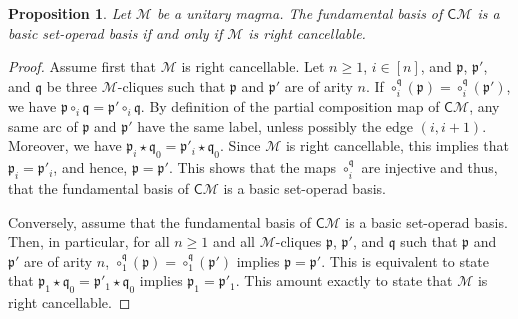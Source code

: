 \documentclass[10pt,reqno]{amsart}
\numberwithin{equation}{subsection}
\renewcommand{\geq}{\geqslant}
\newtheorem{Proposition}[Theorem]{Proposition}
\newcommand{\Mca}{\mathcal{M}}
\newcommand{\Pfr}{\mathfrak{p}}
\newcommand{\Qfr}{\mathfrak{q}}
\newcommand{\Cli}{\mathsf{C}}
\newcommand{\Op}{\star}
\begin{document}
\begin{Proposition} \label{prop:basic_Cli_M}
    Let $\Mca$ be a unitary magma. The fundamental basis of $\Cli\Mca$
    is a basic set-operad basis if and only if $\Mca$ is right
    cancellable.
\end{Proposition}
\begin{proof}
    Assume first that $\Mca$ is right cancellable. Let $n \geq 1$,
    $i \in [n]$, and $\Pfr$, $\Pfr'$, and $\Qfr$ be three $\Mca$-cliques
    such that $\Pfr$ and $\Pfr'$ are of arity $n$. If
    $\circ_i^\Qfr(\Pfr) = \circ_i^\Qfr(\Pfr')$, we have
    $\Pfr \circ_i \Qfr = \Pfr' \circ_i \Qfr$. By definition of the
    partial composition map of $\Cli\Mca$, any same arc of $\Pfr$ and
    $\Pfr'$ have the same label, unless possibly the edge $(i, i + 1)$.
    Moreover, we have
    \begin{math}
        \Pfr_i \Op \Qfr_0 = \Pfr'_i \Op \Qfr_0.
    \end{math}
    Since $\Mca$ is right cancellable, this implies that
    $\Pfr_i = \Pfr'_i$, and hence, $\Pfr = \Pfr'$. This shows that the
    maps $\circ_i^\Qfr$ are injective and thus, that the fundamental
    basis of $\Cli\Mca$ is a basic set-operad basis.
    \smallskip

    Conversely, assume that the fundamental basis of $\Cli\Mca$ is a
    basic set-operad basis. Then, in particular, for all $n \geq 1$ and
    all $\Mca$-cliques $\Pfr$, $\Pfr'$, and $\Qfr$ such that $\Pfr$ and
    $\Pfr'$ are of arity $n$, $\circ_1^\Qfr(\Pfr) = \circ_1^\Qfr(\Pfr')$
    implies $\Pfr = \Pfr'$. This is equivalent to state that
    \begin{math}
        \Pfr_1 \Op \Qfr_0 = \Pfr'_1 \Op \Qfr_0
    \end{math}
    implies $\Pfr_1 = \Pfr'_1$. This amount exactly to state that $\Mca$
    is right cancellable.
\end{proof}
\medskip

\end{document}
